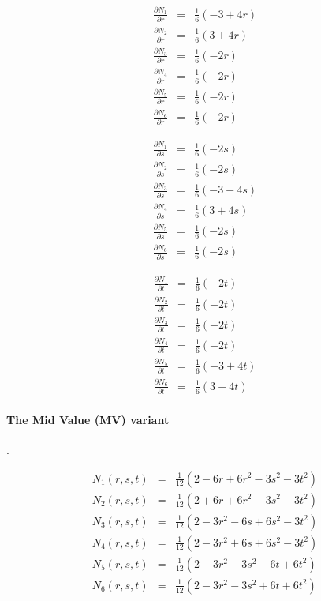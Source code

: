 \begin{eqnarray}
\frac{\partial N_1}{\partial r} &=& \frac{1}{6} (-3+4r )\\
\frac{\partial N_2}{\partial r} &=& \frac{1}{6} (3+4r )\\
\frac{\partial N_3}{\partial r} &=& \frac{1}{6} (-2r) \\
\frac{\partial N_4}{\partial r} &=& \frac{1}{6} (-2r) \\
\frac{\partial N_5}{\partial r} &=& \frac{1}{6} (-2r) \\
\frac{\partial N_6}{\partial r} &=& \frac{1}{6} (-2r) 
\end{eqnarray}

\begin{eqnarray}
\frac{\partial N_1}{\partial s} &=& \frac{1}{6} (-2s)\\ 
\frac{\partial N_2}{\partial s} &=& \frac{1}{6} (-2s) \\
\frac{\partial N_3}{\partial s} &=& \frac{1}{6} (-3+4s )\\
\frac{\partial N_4}{\partial s} &=& \frac{1}{6} (3+4s )\\
\frac{\partial N_5}{\partial s} &=& \frac{1}{6} (-2s) \\
\frac{\partial N_6}{\partial s} &=& \frac{1}{6} (-2s) 
\end{eqnarray}

\begin{eqnarray}
\frac{\partial N_1}{\partial t} &=& \frac{1}{6}(-2t) \\ 
\frac{\partial N_2}{\partial t} &=& \frac{1}{6}(-2t) \\ 
\frac{\partial N_3}{\partial t} &=& \frac{1}{6}(-2t) \\ 
\frac{\partial N_4}{\partial t} &=& \frac{1}{6}(-2t) \\ 
\frac{\partial N_5}{\partial t} &=& \frac{1}{6}(-3+4t) \\ 
\frac{\partial N_6}{\partial t} &=& \frac{1}{6}(3+4t)  
\end{eqnarray}


\paragraph{The Mid Value (MV) variant}. 

\begin{eqnarray}
N_1(r,s,t) &=& \frac{1}{12}(2-6r+6r^2-3s^2-3t^2) \\
N_2(r,s,t) &=& \frac{1}{12}(2+6r+6r^2-3s^2-3t^2) \\
N_3(r,s,t) &=& \frac{1}{12}(2-3r^2-6s+6s^2-3t^2) \\
N_4(r,s,t) &=& \frac{1}{12}(2-3r^2+6s+6s^2-3t^2) \\
N_5(r,s,t) &=& \frac{1}{12}(2-3r^2-3s^2-6t+6t^2) \\
N_6(r,s,t) &=& \frac{1}{12}(2-3r^2-3s^2+6t+6t^2)
\end{eqnarray}


